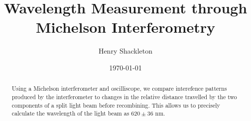 \usepackage{graphicx}      %
\usepackage{lipsum}
\usepackage{float}
\usepackage{bm}            %
\usepackage[colorlinks=true]{hyperref}  %




\title{Wavelength Measurement through Michelson Interferometry}
\author{Henry Shackleton}
\date{\today}


\begin{abstract}
  Using a Michelson interferometer and oscilliscope, we compare interefence patterns produced by the interferometer to changes in the relative distance travelled by the two components of a split light beam before recombining. This allows us to precisely calculate the wavelength of the light beam as $620 \pm 36$ nm.
\end{abstract}

\maketitle






